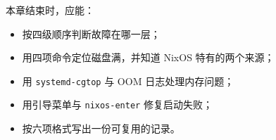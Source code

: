\begin{checkpoint}
本章结束时，应能：
\begin{itemize}
  \item 按四级顺序判断故障在哪一层；
  \item 用四项命令定位磁盘满，并知道 NixOS 特有的两个来源；
  \item 用 \texttt{systemd-cgtop} 与 OOM 日志处理内存问题；
  \item 用引导菜单与 \texttt{nixos-enter} 修复启动失败；
  \item 按六项格式写出一份可复用的记录。
\end{itemize}
\end{checkpoint}
